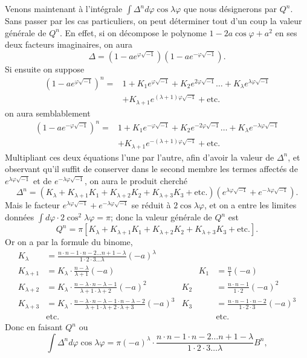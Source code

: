 \documentclass{article}
\begin{document}
Venons maintenant à l'intégrale $\displaystyle\int\Delta^{n}d\varphi\cos\lambda\varphi$ que nous désignerons par $Q^{n}$. Sans passer par les cas particuliers, on peut déterminer tout d'un coup la valeur générale de $Q^{n}$. En effet, si on décompose le polynome $1-2a\cos\varphi+a^{2}$ en ses deux facteurs imaginaires, on aura
\[ \Delta=(1-ae^{\varphi\sqrt{-1}})(1-ae^{-\varphi\sqrt{-1}}). \]
Si ensuite on suppose
\[ \begin{aligned} (1-ae^{\varphi\sqrt{-1}})^{n}={}&1+K_{1}e^{\varphi\sqrt{-1}}+K_{2}e^{2\varphi\sqrt{-1}}\ldots+K_{\lambda}e^{\lambda\varphi\sqrt{-1}}\\ &+K_{\lambda+1}e^{(\lambda+1)\varphi\sqrt{-1}}+\text{etc.} \end{aligned} \]
on aura semblablement
\[ \begin{aligned} (1-ae^{-\varphi\sqrt{-1}})^{n}={}&1+K_{1}e^{-\varphi\sqrt{-1}}+K_{2}e^{-2\varphi\sqrt{-1}}\ldots+K_{\lambda}e^{-\lambda\varphi\sqrt{-1}}\\ &+K_{\lambda+1}e^{-(\lambda+1)\varphi\sqrt{-1}}+\text{etc.} \end{aligned} \]
Multipliant ces deux équations l'une par l'autre, afin d'avoir la valeur de $\Delta^{n}$, et observant qu'il suffit de conserver dans le second membre les termes affectés de $e^{\lambda\varphi\sqrt{-1}}$ et de $e^{-\lambda\varphi\sqrt{-1}}$, on aura le produit cherché
\[ \Delta^{n}=(K_{\lambda}+K_{\lambda+1}K_{1}+K_{\lambda+2}K_{2}+K_{\lambda+3}K_{3}+\text{etc.})(e^{\lambda\varphi\sqrt{-1}}+e^{-\lambda\varphi\sqrt{-1}}). \]
Mais le facteur $e^{\lambda\varphi\sqrt{-1}}+e^{-\lambda\varphi\sqrt{-1}}$ se réduit à $2\cos\lambda\varphi$, et on a entre les limites données $\displaystyle\int d\varphi\cdot2\cos^{2}\lambda\varphi=\pi$; donc la valeur générale de $Q^{n}$ est
\[ Q^{n}=\pi[K_{\lambda}+K_{\lambda+1}K_{1}+K_{\lambda+2}K_{2}+K_{\lambda+3}K_{3}+\text{etc.}]. \]
Or on a par la formule du binome,
\[ \begin{aligned} K_{\lambda}&=\frac{n\cdot n-1\cdot n-2\ldots n+1-\lambda}{1\cdot2\cdot3\ldots\lambda}(-a)^{\lambda}\\ K_{\lambda+1}&=K_{\lambda}\cdot\frac{n-\lambda}{\lambda+1}(-a) &\qquad K_{1}&=\frac{n}{1}(-a)\\ K_{\lambda+2}&=K_{\lambda}\cdot\frac{n-\lambda\cdot n-\lambda-1}{\lambda+1\cdot\lambda+2}(-a)^{2} & K_{2}&=\frac{n\cdot n-1}{1\cdot2}(-a)^{2}\\ K_{\lambda+3}&=K_{\lambda}\cdot\frac{n-\lambda\cdot n-\lambda-1\cdot n-\lambda-2}{\lambda+1\cdot\lambda+2\cdot\lambda+3}(-a)^{3} & K_{3}&=\frac{n\cdot n-1\cdot n-2}{1\cdot2\cdot3}(-a)^{3}\\ &\text{etc.} && \text{etc.} \end{aligned} \]
Donc en faisant $Q^{n}$ ou
\[ \int\Delta^{n}d\varphi\cos\lambda\varphi=\pi(-a)^{\lambda}\cdot\frac{n\cdot n-1\cdot n-2\ldots n+1-\lambda}{1\cdot2\cdot3\ldots\lambda}B^{n}, \]
\end{document}
